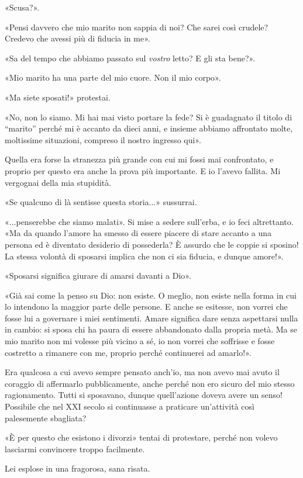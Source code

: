\documentclass[a4paper,11pt,oneside,openright,final]{memoir}
\begin{document}
«Scusa?».

«Pensi davvero che mio marito non sappia di noi? Che sarei così crudele? Credevo
che avessi più di fiducia in me».

«Sa del tempo che abbiamo passato sul \emph{vostro} letto? E gli sta bene?».

«Mio marito ha una parte del mio cuore. Non il mio corpo».

«Ma siete sposati!» protestai.

«No, non lo siamo. Mi hai mai visto portare la fede? Si è guadagnato il titolo
di ``marito'' perché mi è accanto da dieci anni, e insieme abbiamo affrontato
molte, moltissime situazioni, compreso il nostro ingresso qui».

Quella era forse la stranezza più grande con cui mi fossi mai confrontato, e
proprio per questo era anche la prova più importante. E io l'avevo fallita. Mi
vergognai della mia stupidità.

«Se qualcuno di là sentisse questa storia...» sussurrai.

«...penserebbe che siamo malati». Si mise a sedere sull'erba, e io feci
altrettanto. «Ma da quando l'amore ha smesso di essere piacere di stare accanto
a una persona ed è diventato desiderio di possederla? È assurdo che le coppie si
sposino! La stessa volontà di sposarsi implica che non ci sia fiducia, e dunque
amore!».

«Sposarsi significa giurare di amarsi davanti a Dio».

«Già sai come la penso su Dio: non esiste. O meglio, non esiste nella forma in
cui lo intendono la maggior parte delle persone. E anche se esitesse, non vorrei
che fosse lui a governare i miei sentimenti. Amare significa dare senza
aspettarsi nulla in cambio: si sposa chi ha paura di essere abbandonato dalla
propria metà. Ma se mio marito non mi volesse più vicino a sé, io non vorrei che
soffrisse e fosse costretto a rimanere con me, proprio perché continuerei ad
amarlo!».

Era qualcosa a cui avevo sempre pensato anch'io, ma non avevo mai avuto il
coraggio di affermarlo pubblicamente, anche perché non ero sicuro del mio stesso
ragionamento. Tutti si sposavano, dunque quell'azione doveva avere un senso!
Possibile che nel XXI secolo si continuasse a praticare un'attività così
palesemente sbagliata?

«È per questo che esistono i divorzi» tentai di protestare, perché non volevo
lasciarmi convincere troppo facilmente.

Lei esplose in una fragorosa, sana risata.
\end{document}
